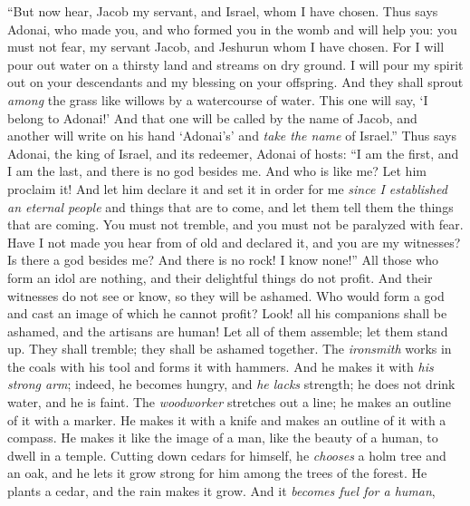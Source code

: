 \begin{biblechapter} %
 “But now hear, Jacob my servant, 
and Israel, whom I have chosen.
\verse Thus says Adonai, who made you, 
and who formed you in the womb and will help you: 
you must not fear, my servant Jacob, 
and Jeshurun whom I have chosen.
\verse For I will pour out water on a thirsty land 
and streams on dry ground. 
I will pour my spirit out on your descendants 
and my blessing on your offspring.
\verse And they shall sprout \textit{among} the grass 
like willows by a watercourse of water.
\verse This one will say, ‘I belong to Adonai!’ 
And that one will be called by the name of Jacob, 
and another will write on his hand ‘Adonai’s’ 
and \textit{take the name} of Israel.”
 Thus says Adonai, the king of Israel, 
and its redeemer, Adonai of hosts: 
“I am the first, and I am the last, 
and there is no god besides me.
\verse And who is like me? Let him proclaim it! 
And let him declare it and set it in order for me 
\textit{since I established an eternal people} and things that are to come, 
and let them tell them the things that are coming.
\verse You must not tremble, 
and you must not be paralyzed with fear. 
Have I not made you hear from of old 
and declared it, and you are my witnesses? 
Is there a god besides me? 
And there is no rock! I know none!”
 All those who form an idol are nothing, 
and their delightful things do not profit. 
And their witnesses do not see or know, 
so they will be ashamed.
\verse Who would form a god 
and cast an image of which he cannot profit?
\verse Look! all his companions shall be ashamed, 
and the artisans are human! 
Let all of them assemble; 
let them stand up. 
They shall tremble; 
they shall be ashamed together.
\verse The \textit{ironsmith} works in the coals with his tool 
and forms it with hammers. 
And he makes it with \textit{his strong arm}; 
indeed, he becomes hungry, and \textit{he lacks} strength; 
he does not drink water, and he is faint.
\verse The \textit{woodworker} stretches out a line; 
he makes an outline of it with a marker. 
He makes it with a knife 
and makes an outline of it with a compass. 
He makes it like the image of a man, 
like the beauty of a human, to dwell in a temple.
\verse Cutting down cedars for himself, 
he \textit{chooses} a holm tree and an oak, 
and he lets it grow strong for him among the trees of the forest. 
He plants a cedar, and the rain makes it grow.
\verse And it \textit{becomes fuel for a human}, 

\end{biblechapter}
